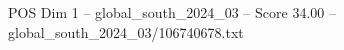 \begin{textsample}{POS Dim 1 – global\_south\_2024\_03 – Score 34.00 – global\_south\_2024\_03/106740678.txt}
\end{textsample}
